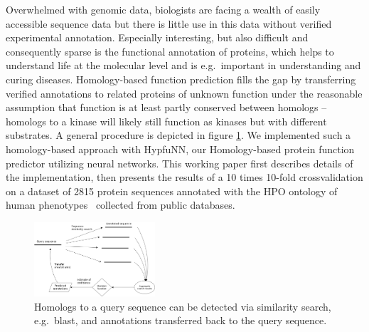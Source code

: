 Overwhelmed with genomic data, biologists are facing a wealth of easily accessible sequence data but there is little use in this data without verified experimental annotation. Especially interesting, but also difficult and consequently sparse is the functional annotation of proteins, which helps to understand life at the molecular level and is e.g.~important in understanding and curing diseases. Homology-based function prediction fills the gap by transferring verified annotations to related proteins of unknown function under the reasonable assumption that function is at least partly conserved between homologs -- homologs to a kinase will likely still function as kinases but with different substrates. A general procedure is depicted in figure \ref{fig:function_transfer}. We implemented such a homology-based approach with HypfuNN, our Homology-based protein function predictor utilizing neural networks. This working paper first describes details of the implementation, then presents the results of a 10 times 10-fold crossvalidation on a dataset of 2815 protein sequences annotated with the HPO ontology of human phenotypes~\citep{Koehler2014} collected from public databases.

\begin{figure}[!hb]
\includegraphics[width = 0.4\textwidth]{figures/function_transfer.png}
\caption{Homologs to a query sequence can be detected via similarity search, e.g.~blast, and annotations transferred back to the query sequence.}
\label{fig:function_transfer}
\end{figure}
